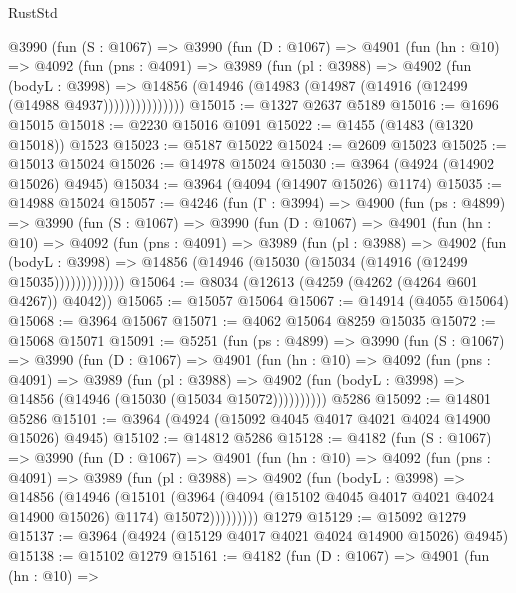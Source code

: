 \begin{lexlean}{RustStd}
\begin{coremodule}
        @3990
          (fun (S : @1067) =>
          @3990
            (fun (D : @1067) =>
            @4901
              (fun (hn : @10) =>
              @4092
                (fun (pns : @4091) =>
                @3989
                  (fun (pl : @3988) =>
                  @4902
                    (fun (bodyL : @3998) =>
                    @14856 (@14946 (@14983 (@14987 (@14916 (@12499 (@14988 @4937)))))))))))))))
@15015 := @1327 @2637 @5189
@15016 := @1696 @15015
@15018 := @2230 @15016 @1091
@15022 := @1455 (@1483 (@1320 @15018)) @1523
@15023 := @5187 @15022
@15024 := @2609 @15023
@15025 := @15013 @15024
@15026 := @14978 @15024
@15030 := @3964 (@4924 (@14902 @15026) @4945)
@15034 := @3964 (@4094 (@14907 @15026) @1174)
@15035 := @14988 @15024
@15057 := @4246
    (fun (Γ : @3994) =>
    @4900
      (fun (ps : @4899) =>
      @3990
        (fun (S : @1067) =>
        @3990
          (fun (D : @1067) =>
          @4901
            (fun (hn : @10) =>
            @4092
              (fun (pns : @4091) =>
              @3989
                (fun (pl : @3988) =>
                @4902
                  (fun (bodyL : @3998) =>
                  @14856 (@14946 (@15030 (@15034 (@14916 (@12499 @15035)))))))))))))
@15064 := @8034 (@12613 (@4259 (@4262 (@4264 @601 @4267)) @4042))
@15065 := @15057 @15064
@15067 := @14914 (@4055 @15064)
@15068 := @3964 @15067
@15071 := @4062 @15064 @8259 @15035
@15072 := @15068 @15071
@15091 := @5251
    (fun (ps : @4899) =>
    @3990
      (fun (S : @1067) =>
      @3990
        (fun (D : @1067) =>
        @4901
          (fun (hn : @10) =>
          @4092
            (fun (pns : @4091) =>
            @3989
              (fun (pl : @3988) =>
              @4902 (fun (bodyL : @3998) => @14856 (@14946 (@15030 (@15034 @15072))))))))))
    @5286
@15092 := @14801 @5286
@15101 := @3964 (@4924 (@15092 @4045 @4017 @4021 @4024 @14900 @15026) @4945)
@15102 := @14812 @5286
@15128 := @4182
    (fun (S : @1067) =>
    @3990
      (fun (D : @1067) =>
      @4901
        (fun (hn : @10) =>
        @4092
          (fun (pns : @4091) =>
          @3989
            (fun (pl : @3988) =>
            @4902
              (fun (bodyL : @3998) =>
              @14856
                (@14946
                  (@15101
                    (@3964
                      (@4094 (@15102 @4045 @4017 @4021 @4024 @14900 @15026) @1174)
                      @15072)))))))))
    @1279
@15129 := @15092 @1279
@15137 := @3964 (@4924 (@15129 @4017 @4021 @4024 @14900 @15026) @4945)
@15138 := @15102 @1279
@15161 := @4182
    (fun (D : @1067) =>
    @4901
      (fun (hn : @10) =>

\end{coremodule}
\end{lexlean}
